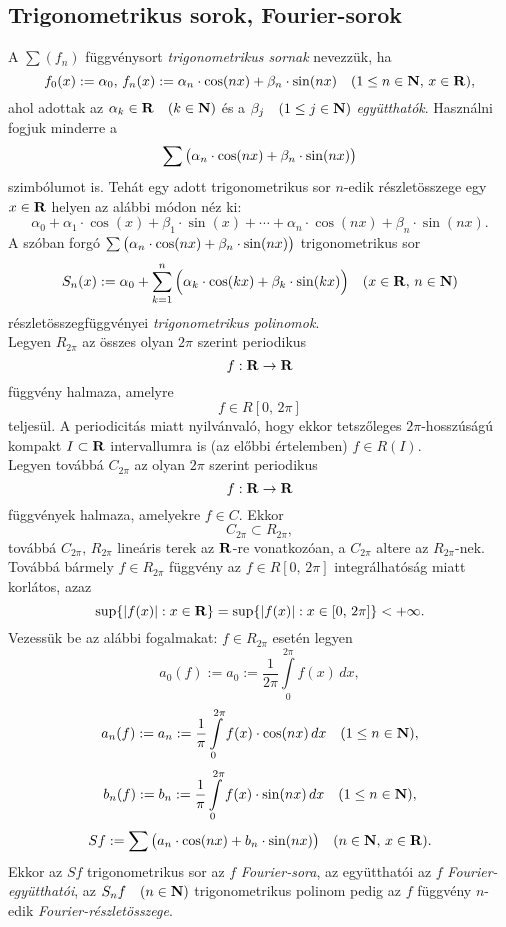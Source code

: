 \subsection{Trigonometrikus sorok, Fourier-sorok}
A $\sum(f_n)$ függvénysort \textit{trigonometrikus sornak} nevezzük, ha
\[
	f_0(x) := \alpha_0, \, f_n(x) := \alpha_n \cdot \cos(nx) + \beta_n \cdot \sin(nx) \quad (1 \leq n \in \mathbf{N}, \, x \in \mathbf{R}),
\]
ahol adottak az $\alpha_k \in \mathbf{R} \quad (k \in \mathbf{N})$ és a $\beta_j \quad (1 \leq j \in \mathbf{N})$ \textit{együtthatók}. Használni fogjuk minderre a
\[
	\sum\big( \alpha_n \cdot \cos(nx) + \beta_n \cdot \sin(nx) \big)
\]
szimbólumot is. Tehát egy adott trigonometrikus sor $n$-edik részletösszege egy $x \in \mathbf{R}$ helyen az alábbi módon néz ki:
\[
	\alpha_0 + \alpha_1 \cdot \cos(x) + \beta_1 \cdot \sin(x) + \cdots + \alpha_n \cdot \cos(nx) + \beta_n \cdot \sin(nx).
\]
A szóban forgó $\sum\big( \alpha_n \cdot \cos(nx) + \beta_n \cdot \sin(nx) \big)$ trigonometrikus sor
\[
	S_n(x) := \alpha_0 + \sum_{k=1}^n \Big( \alpha_k \cdot \cos(kx) + \beta_k \cdot \sin(kx) \Big) \quad (x \in \mathbf{R}, \, n \in \mathbf{N})
\]
részletösszegfüggvényei \textit{trigonometrikus polinomok}.\\

Legyen $R_{2\pi}$ az összes olyan $2\pi$ szerint periodikus
\[
	f : \mathbf{R} \to \mathbf{R}
\]
függvény halmaza, amelyre
\[
	f \in R[0, \, 2\pi]
\]
teljesül. A periodicitás miatt nyilvánvaló, hogy ekkor tetszőleges $2\pi$-hosszúságú kompakt $I \subset \mathbf{R}$ intervallumra is (az előbbi értelemben) $f \in R(I)$.\\

Legyen továbbá $C_{2\pi}$ az olyan $2\pi$ szerint periodikus
\[
	f : \mathbf{R} \to \mathbf{R}
\]
függvények halmaza, amelyekre $f \in C$. Ekkor
\[
	C_{2\pi} \subset R_{2\pi},
\]
továbbá $C_{2\pi}, \, R_{2\pi}$ lineáris terek az $\mathbf{R}$-re vonatkozóan, a $C_{2\pi}$ altere az $R_{2\pi}$-nek. Továbbá bármely $f \in R_{2\pi}$ függvény az $f \in R[0, \, 2\pi]$ integrálhatóság miatt korlátos, azaz
\[
	\sup\{|f(x)| : x \in \mathbf{R}\} = \sup\{|f(x)| : x \in [0, \, 2\pi]\} < + \infty.
\]
Vezessük be az alábbi fogalmakat: $f \in R_{2\pi}$ esetén legyen
\[
	a_0(f) := a_0 := \frac{1}{2\pi} \int\limits_0^{2\pi} f(x) \, dx,
\]
\[
	a_n(f) := a_n := \frac{1}{\pi} \int\limits_0^{2\pi} f(x) \cdot \cos(nx) \, dx \quad (1 \leq n \in \mathbf{N}),
\]
\[
	b_n(f) := b_n := \frac{1}{\pi} \int\limits_0^{2\pi} f(x) \cdot \sin(nx) \, dx \quad (1 \leq n \in \mathbf{N}),
\]
\[
	Sf := \sum\big( a_n \cdot \cos(nx) + b_n \cdot \sin(nx) \big) \quad (n \in \mathbf{N}, \, x \in \mathbf{R}).
\]
Ekkor az $Sf$ trigonometrikus sor az $f$ \textit{Fourier-sora}, az együtthatói az $f$ \textit{Fourier-együtthatói}, az $S_nf \quad (n \in \mathbf{N})$ trigonometrikus polinom pedig az $f$ függvény $n$-edik \textit{Fourier-részletösszege}.\\

